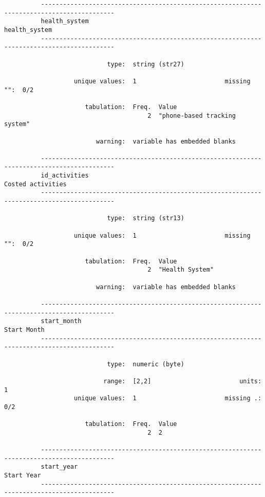 \documentclass{article}
\begin{document}
\begin{verbatim}
          ------------------------------------------------------------------------------------------
          health_system                                                                health_system
          ------------------------------------------------------------------------------------------
          
                            type:  string (str27)
          
                   unique values:  1                        missing "":  0/2
          
                      tabulation:  Freq.  Value
                                       2  "phone-based tracking system"
          
                         warning:  variable has embedded blanks
          
          ------------------------------------------------------------------------------------------
          id_activities                                                            Costed activities
          ------------------------------------------------------------------------------------------
          
                            type:  string (str13)
          
                   unique values:  1                        missing "":  0/2
          
                      tabulation:  Freq.  Value
                                       2  "Health System"
          
                         warning:  variable has embedded blanks
          
          ------------------------------------------------------------------------------------------
          start_month                                                                    Start Month
          ------------------------------------------------------------------------------------------
          
                            type:  numeric (byte)
          
                           range:  [2,2]                        units:  1
                   unique values:  1                        missing .:  0/2
          
                      tabulation:  Freq.  Value
                                       2  2
          
          ------------------------------------------------------------------------------------------
          start_year                                                                      Start Year
          ------------------------------------------------------------------------------------------
          

\end{verbatim}
\end{document}
